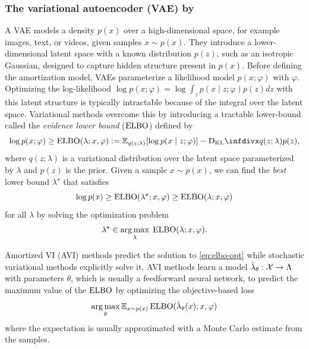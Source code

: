 \documentclass[twoside,11pt]{article}
\begin{document}
\subsubsection{The variational autoencoder (VAE) by \citet{kingma2013auto}}
A VAE models a density $p(x)$ over a high-dimensional space,
for example images, text, or videos, given samples $x\sim p(x)$.
They introduce a lower-dimensional latent space
with a known distribution $p(z)$, such as an isotropic Gaussian,
designed to capture hidden structure present
in $p(x)$.
Before defining the amortization model,
VAEs parameterize a likelihood model $p(x; \varphi)$ with $\varphi$.
Optimizing the log-likelihood
$\log p(x; \varphi)=\log\int_z p(x\mid z; \varphi)p(z)dz$
with this latent structure is typically intractable because
of the integral over the latent space.
Variational methods overcome this by introducing
a tractable lower-bound called the
\emph{evidence lower bound} ($\operatorname{ELBO}$) defined by
\begin{equation}
  \log p(x; \varphi)\geq \ELBO(\lambda; x, \varphi) \defeq \E_{q(z; \lambda)}[\log p(x\mid z; \varphi)] - \kl{q(z;\lambda)}{p(z)},
  \label{eq:elbo}
\end{equation}
where $q(z; \lambda)$ is a variational distribution
over the latent space parameterized by $\lambda$
and $p(z)$ is the prior.
Given a sample $x\sim p(x)$, we can find the \emph{best}
lower bound $\lambda^\star$ that satisfies
\begin{equation}
  \log p(x)\geq \operatorname{ELBO}(\lambda^\star; x, \varphi) \geq \operatorname{ELBO}(\lambda; x, \varphi)
  \label{eq:best-elbo}
\end{equation}
for all $\lambda$ by solving the optimization problem
\begin{equation}
  \lambda^\star \in \operatorname*{arg\,max}_\lambda\; \operatorname{ELBO}(\lambda; x, \varphi).
  \label{eq:elbo-opt}
\end{equation}

Amortized VI (AVI) methods predict the solution to
\cref{eq:elbo-opt} while stochastic variational
methods \citep{hoffman2013stochastic} explicitly solve it.
AVI methods learn a model $\hat \lambda_\theta: {\mathcal{X}}\rightarrow \Lambda$
with parameters $\theta$, which is usually a feedforward neural network,
to predict the maximum value of the $\operatorname{ELBO}$ by optimizing
the objective-based loss
\begin{equation}
  \operatorname*{arg\,max}_\theta \operatorname{\mathbb{E}}_{x\sim p(x)} \operatorname{ELBO}(\hat \lambda_\theta(x); x, \varphi)
  \label{eq:vae-amor}
\end{equation}
where the expectation is usually approximated with a
Monte Carlo estimate from the samples.
\end{document}
